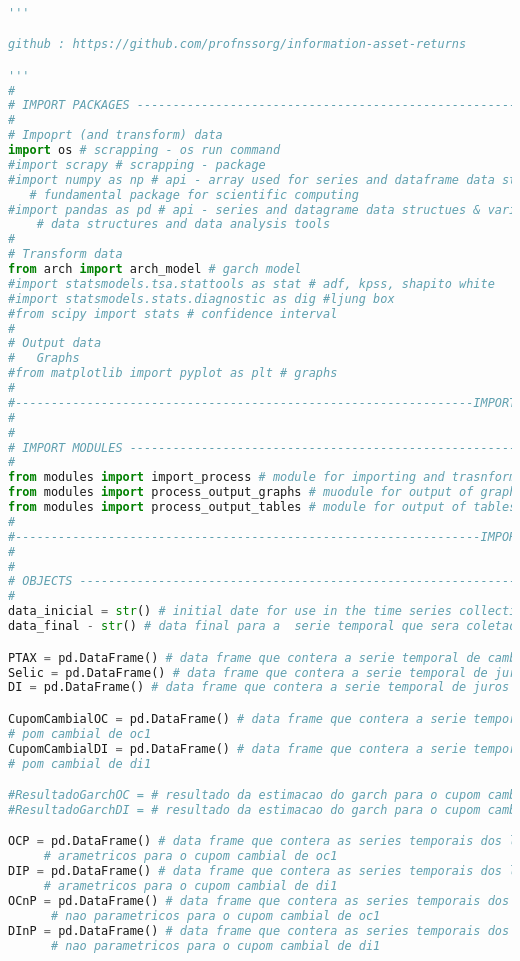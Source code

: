 \begin{lstlisting}[language=Python]

'''

github : https://github.com/profnssorg/information-asset-returns

'''
#
# IMPORT PACKAGES --------------------------------------------------------------
#
# Impoprt (and transform) data
import os # scrapping - os run command
#import scrapy # scrapping - package
#import numpy as np # api - array used for series and dataframe data structures
   # fundamental package for scientific computing
#import pandas as pd # api - series and datagrame data structues & various 
    # data structures and data analysis tools
#
# Transform data
from arch import arch_model # garch model
#import statsmodels.tsa.stattools as stat # adf, kpss, shapito white
#import statsmodels.stats.diagnostic as dig #ljung box
#from scipy import stats # confidence interval
#
# Output data
#	Graphs
#from matplotlib import pyplot as plt # graphs
#
#----------------------------------------------------------------IMPORT PACKAGES
#
#
# IMPORT MODULES ---------------------------------------------------------------
#
from modules import import_process # module for importing and trasnforming data
from modules import process_output_graphs # muodule for output of graphs
from modules import process_output_tables # module for output of tables
#
#-----------------------------------------------------------------IMPORT MODULES
#
#
# OBJECTS ----------------------------------------------------------------------
#
data_inicial = str() # initial date for use in the time series collection via API
data_final - str() # data final para a  serie temporal que sera coletada

PTAX = pd.DataFrame() # data frame que contera a serie temporal de cambio (PTAX)
Selic = pd.DataFrame() # data frame que contera a serie temporal de juros Selic
DI = pd.DataFrame() # data frame que contera a serie temporal de juros DI

CupomCambialOC = pd.DataFrame() # data frame que contera a serie temporal do cu_
# pom cambial de oc1
CupomCambialDI = pd.DataFrame() # data frame que contera a serie temporal do cu_
# pom cambial de di1

#ResultadoGarchOC = # resultado da estimacao do garch para o cupom cambial de oc1
#ResultadoGarchDI = # resultado da estimacao do garch para o cupom cambial de oc1

OCP = pd.DataFrame() # data frame que contera as series temporais dos limites p_
     # arametricos para o cupom cambial de oc1
DIP = pd.DataFrame() # data frame que contera as series temporais dos limites p_
     # arametricos para o cupom cambial de di1
OCnP = pd.DataFrame() # data frame que contera as series temporais dos limites 
      # nao parametricos para o cupom cambial de oc1
DInP = pd.DataFrame() # data frame que contera as series temporais dos limites
      # nao parametricos para o cupom cambial de di1



\end{lstlisting}
